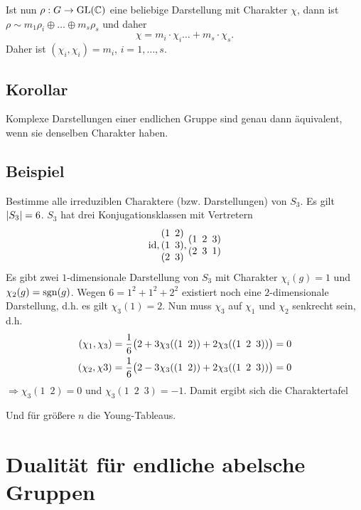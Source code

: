 Ist nun $\rho : G \to \GL(\mathds{C})$ eine beliebige Darstellung mit Charakter $\chi$, dann ist $\rho \sim m_1 \rho_i \oplus \ldots \oplus m_s \rho_s$ und daher
\[
	\chi = m_i \cdot \chi_i \ldots + m_s \cdot \chi_s.
\]
Daher ist $(\chi_i, \chi_i)= m_i$, $i=1, \ldots ,s$.

\subsection{Korollar} %
\label{sub:430}
Komplexe Darstellungen einer endlichen Gruppe sind genau dann äquivalent, wenn sie denselben Charakter haben.

\subsection{Beispiel} %
\label{sub:431}
Bestimme alle irreduziblen Charaktere (bzw. Darstellungen) von $S_3$. Es gilt $\abs*{S_3}=6$. $S_3$ hat drei Konjugationsklassen mit Vertretern 
\[
	\id, \begin{matrix}
		(1  \enspace 2) \\
		(1 \enspace 3) \\
		(2 \enspace 3)
	\end{matrix} ,
	\begin{matrix}
		(1 \enspace 2 \enspace 3) \\
		(2 \enspace 3 \enspace 1)
	\end{matrix}
\]
Es gibt zwei $1$-dimensionale Darstellung von $S_3$ mit Charakter $\chi_i(g)=1$ und $\chi_2(g)= \sgn(g)$. Wegen $6= 1^2 + 1^2 + 2^2$ existiert noch eine $2$-dimensionale
Darstellung, d.h. es gilt $\chi_3(1)=2$. Nun muss $\chi_3$ auf $\chi_1$ und $\chi_2$ senkrecht sein, d.h. 
\begin{align*}
	(\chi_1, \chi_3) &= \frac{1}{6} \enbrace[\big]{2+3 \chi_3( (1 \enspace2)) + 2 \chi_3((1 \enspace 2 \enspace 3))} = 0 \\
	(\chi_2, \chi3) &= \frac{1}{6} \enbrace[\big]{2 - 3 \chi_3((1 \enspace 2)) + 2 \chi_3((1 \enspace 2 \enspace 3))} =0  
\end{align*}
$\Rightarrow \chi_3(1 \enspace 2) = 0$ und $\chi_3(1 \enspace 2 \enspace 3)= -1$. Damit ergibt sich die Charaktertafel
\begin{table}[H]
	
\end{table}
Und für größere $n$ die Young-Tableaus.
\section*{Dualität für endliche abelsche Gruppen} %
\label{sec:dualitaet}


